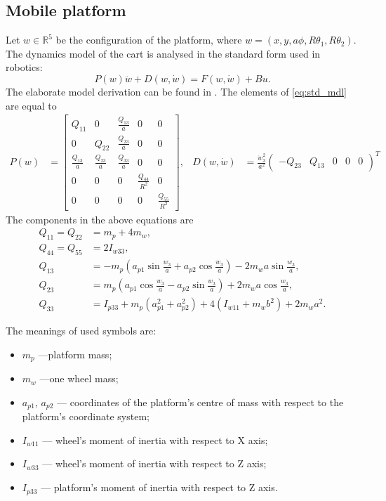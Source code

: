 \subsection{Mobile platform}
Let $w\in \mathbb{R}^5$ be the configuration of the platform, where
$w=(x, y, a\phi, R\theta_1, R\theta_2)$.  
The dynamics model of the cart is analysed in the standard form used in robotics:
\begin{equation}
\label{eq:std_mdl}
P(w)\ddot w + D(w, \dot w) = F(w, \dot w) + Bu.
\end{equation}
The elaborate model derivation can be found in \cite{coupled}. 
The elements of \eqref{eq:std_mdl} are equal to
\begin{align*}
P(w) &= \begin{bmatrix}
Q_{11} & 0 & \frac{Q_{13}}{a} & 0 & 0\\
0 & Q_{22} & \frac{Q_{23}}{a} & 0 & 0\\
\frac{Q_{13}}{a} & \frac{Q_{23}}{a} & \frac{Q_{33}}{a} & 0 & 0\\
0 & 0 & 0 & \frac{Q_{44}}{R^2} & 0 \\
0 & 0 & 0 & 0 & \frac{Q_{55}}{R^2}
\end{bmatrix}, & 
D(w, \dot w) &= \frac{\dot w_3^2}{a^2}\begin{pmatrix}
-Q_{23} & Q_{13} & 0 & 0 & 0
\end{pmatrix}^T
\end{align*}
The components in the above equations are
\begin{align*}
Q_{11} = Q_{22} &= m_p+4m_w,\\
Q_{44} = Q_{55} &= 2I_{w33},\\
Q_{13} &= -m_p(a_{p1}\sin\frac{w_3}{a}+a_{p2}\cos\frac{w_3}{a})- 2m_wa\sin\frac{w_3}{a},\\
Q_{23} &=  m_p(a_{p1}\cos\frac{w_3}{a}-a_{p2}\sin\frac{w_3}{a})+ 2m_wa\cos\frac{w_3}{a},\\
Q_{33} &= I_{p33}+m_p(a_{p1}^2+a_{p2}^2)+4(I_{w11}+m_wb^2)+2m_wa^2.
\end{align*}

The meanings of used symbols are:
\begin{itemize}
\item $m_p$ ---platform mass;
\item $m_w$ ---one wheel mass;
\item $a_{p1}$, $a_{p2}$ --- coordinates of the platform's centre of mass with respect to the platform's coordinate system;
\item $I_{w11}$ --- wheel's moment of inertia with respect to X axis;
\item $I_{w33}$ --- wheel's moment of inertia with respect to Z axis;
\item $I_{p33}$ --- platform's moment of inertia with respect to Z axis.

\end{itemize}

